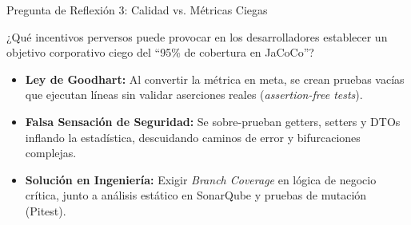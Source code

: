 \documentclass[aspectratio=169]{beamer}
\begin{document}
\begin{frame}{Pregunta de Reflexión 3: Calidad vs. Métricas Ciegas}
  \begin{tcolorbox}[colback=cbBlue!8,colframe=cbBlue,arc=4pt,title=\textbf{Pregunta 3: La Trampa de las Métricas de Cobertura},coltitle=cbWhite,fonttitle=\bfseries\small,top=4pt,bottom=4pt,left=6pt,right=6pt]
    \small ¿Qué incentivos perversos puede provocar en los desarrolladores establecer un objetivo corporativo ciego del ``95\% de cobertura en JaCoCo''?
  \end{tcolorbox}
  \vspace{0.2cm}
  \pause
  \begin{tcolorbox}[colback=cbGreen!10,colframe=cbGreen,arc=4pt,title=\textbf{Análisis y Respuesta de Ingeniería},coltitle=cbWhite,fonttitle=\bfseries\small,top=4pt,bottom=4pt,left=6pt,right=6pt]
    \footnotesize
    \begin{itemize}
      \setlength{\itemsep}{1.5pt}
      \item \textbf{Ley de Goodhart:} Al convertir la métrica en meta, se crean pruebas vacías que ejecutan líneas sin validar aserciones reales (\textit{assertion-free tests}).
      \item \textbf{Falsa Sensación de Seguridad:} Se sobre-prueban getters, setters y DTOs inflando la estadística, descuidando caminos de error y bifurcaciones complejas.
      \item \textbf{Solución en Ingeniería:} Exigir \textit{Branch Coverage} en lógica de negocio crítica, junto a análisis estático en SonarQube y pruebas de mutación (Pitest).
    \end{itemize}
  \end{tcolorbox}
\end{frame}
\end{document}
